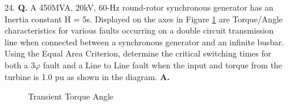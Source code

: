 \documentclass[main.tex]{subfiles}
\begin{document}
\begin{enumerate}
Current design standards set a fixed rate of 1-1.3 for the height to diameter ratio as this is the estimated best ratio to receive the most power output for the least cost. The tip speed ratio is defined as

$$
\lambda = \frac{\text{Tip speed of Blade}}{\text{Wind Speed}} =  \frac{2 \pi r N}{v}
$$

where $N=$ speed in rps (revolutions per second), $r=$ length of the blade, and $v=$ free wind velocity. Calculate revolutions per minute

$$
\begin{aligned}
7 &= \frac{2 \pi \times 45.8 \times N}{13} \\ 
N &= \frac{7 \times 13}{2 \pi \times 45.8}\\
&= 0.32 \mathrm{~rps}\\
&= 0.32 \times 60 = 18.97 \mathrm{~rpm}
\end{aligned}
$$

\item[24.] \textbf{Q.} A 450MVA, 20kV, 60-Hz round-rotor synchronous generator has an Inertia constant H = 5s. Displayed on the axes in Figure \ref{fig:24q_a} are Torque/Angle characteristics for various faults occurring on a double circuit transmission line when connected between a synchronous generator and an infinite busbar. Using the Equal Area Criterion, determine the critical switching times for both a $3 \varphi$ fault and a Line to Line fault when the input and torque from the turbine is 1.0 pu as shown in the diagram. \textbf{A.}

\begin{figure}
\centering{}
\caption{Transient Torque Angle}
\label{fig:24q_a}
\end{figure}

\end{enumerate}
\end{document}

